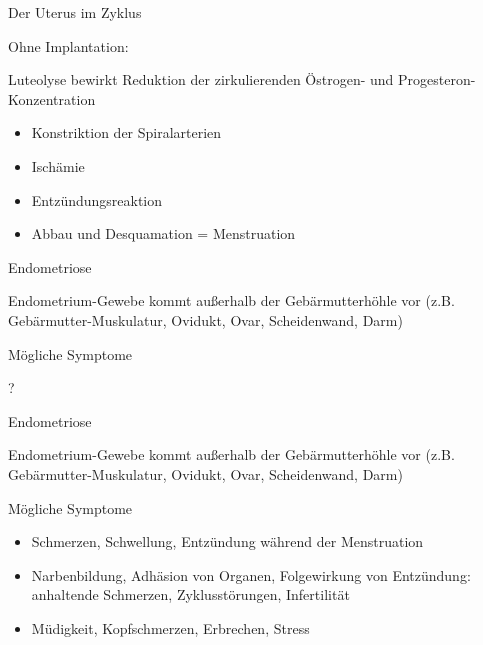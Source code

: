 \documentclass{beamer}
\begin{document}
\begin{frame}{Der  Uterus  im Zyklus}


\begin{block}{Ohne Implantation:}

Luteolyse bewirkt Reduktion der zirkulierenden Östrogen- und Progesteron-Konzentration

\begin{itemize}
\item
Konstriktion der Spiralarterien 
\item
Ischämie 
\item 
Entzündungsreaktion 
\item
Abbau und Desquamation = Menstruation
\end{itemize}

\end{block}


\end{frame}




\begin{frame}{Endometriose}

Endometrium-Gewebe kommt außerhalb der Gebärmutterhöhle vor (z.B. Gebärmutter-Muskulatur, Ovidukt, Ovar, Scheidenwand, Darm)

\begin{block}{Mögliche  Symptome}

? 
\end{block}

\end{frame}

\begin{frame}{Endometriose}

Endometrium-Gewebe kommt außerhalb der Gebärmutterhöhle vor (z.B. Gebärmutter-Muskulatur, Ovidukt, Ovar, Scheidenwand, Darm)

\begin{block}{Mögliche  Symptome}

\begin{itemize}
    \item 
    Schmerzen, Schwellung, Entzündung während der Menstruation
    \item
    Narbenbildung, Adhäsion von Organen, Folgewirkung von Entzündung: anhaltende Schmerzen, Zyklusstörungen, Infertilität
    \item
    Müdigkeit, Kopfschmerzen, Erbrechen, Stress
    
\end{itemize}

\end{block}


\end{frame}
\end{document}
